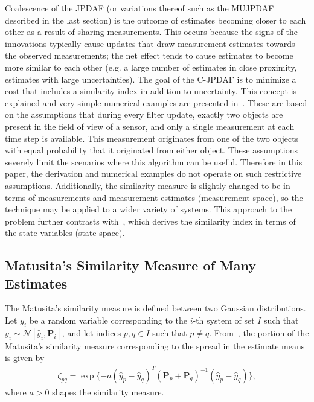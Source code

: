 \documentclass[letterpaper, paper,10pt]{AAS}		%
\begin{document}
Coalescence of the JPDAF (or variations thereof such as the MUJPDAF described in the last section) is the outcome of estimates becoming closer to each other as a result of sharing measurements. This occurs because the signs of the innovations typically cause updates that draw measurement estimates towards the observed measurements; the net effect tends to cause estimates to become more similar to each other (e.g. a large number of estimates in close proximity, estimates with large uncertainties).
The goal of the C-JPDAF is to minimize a cost that includes a similarity index in addition to uncertainty.
This concept is explained and very simple numerical examples are presented in~\cite{KauLovLee14}.
These are based on the assumptions that during every filter update, exactly two objects are present in the field of view of a sensor, and only a single measurement at each time step is available.
This measurement originates from one of the two objects with equal probability that it originated from either object.
These assumptions severely limit the scenarios where this algorithm can be useful.
Therefore in this paper, the derivation and numerical examples do not operate on such restrictive assumptions.
Additionally, the similarity measure is slightly changed to be in terms of measurements and measurement estimates (measurement space), so the technique may be applied to a wider variety of systems.
This approach to the problem further contrasts with~\cite{KauLovLee14}, which derives the similarity index in terms of the state variables (state space).

\subsection{Matusita's Similarity Measure of Many Estimates}

The Matusita's similarity measure is defined between two Gaussian distributions.
Let $y_i$ be a random variable corresponding to the $i$-th system of set $I$ such that $y_i \sim \mathcal{N}[\hat y_i,{\mathbf P}_i]$, and let indices $p,q\in I$ such that $p\neq q$.
From~\cite{KauLovLee14}, the portion of the Matusita's similarity measure corresponding to the spread in the estimate means is given by
\begin{align}
\zeta_{pq}=\exp \{-a(\hat y_{p}- \hat y_{q})^T({\mathbf P}_{p}
+{\mathbf P}_{q})^{-1}(\hat y_{p}-\hat y_{q})\},\label{eqn:Mat2Est}
\end{align}
where $a>0$ shapes the similarity measure.
\end{document}
